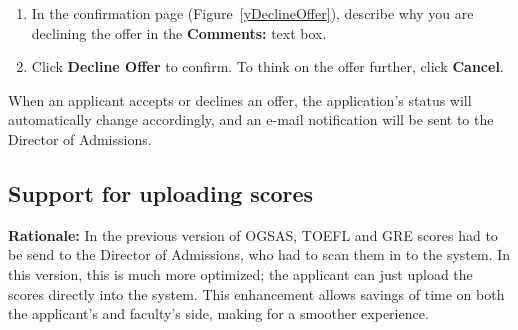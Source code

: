 \documentclass[titlepage]{article}
\begin{document}
\begin{enumerate}
\begin{enumerate}
    \item In the confirmation page (Figure~\ref{yDeclineOffer}), describe why
    you are declining the offer in the \textbf{\textsf{Comments:}} text box.
    \item Click \textbf{\textsf{Decline Offer}} to confirm. To think on the offer
    further, click \textbf{\textsf{Cancel}}.
  \end{enumerate}
\end{enumerate}

When an applicant accepts or declines an offer, the application's status will
automatically change accordingly, and an e-mail notification will be sent to
the Director of Admissions.

\subsection{Support for uploading scores}
\textbf{Rationale:} In the previous version of OGSAS, TOEFL and GRE scores had to be send to the Director of Admissions, who had to scan them in to the system.  In this version, this is much more optimized; the applicant can just upload the scores directly into the system.  This enhancement allows savings of time on both the applicant's and faculty's side, making for a smoother experience.
\end{document}
